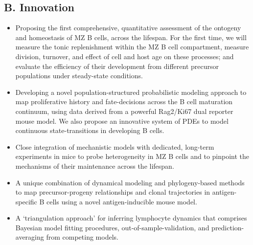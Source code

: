\documentclass[11pt]{article}
\begin{document}
\vspace{-2mm}
\subsection*{B. Innovation}
\vspace{-2mm}
\begin{itemize}
    \item Proposing the first comprehensive, quantitative assessment of the ontogeny and homeostasis of MZ B cells, across the lifespan.
    For the first time, we will measure the tonic replenishment within the MZ B cell compartment, measure division, turnover, and effect of cell and host age on these processes; and evaluate the efficiency of their development from different precursor populations under steady-state conditions.
    \item Developing a novel population-structured probabilistic modeling approach to map proliferative history and fate-decisions across the B cell maturation continuum, using data derived from a powerful Rag2/Ki67 dual reporter mouse model. %
   We also propose an innovative system of PDEs to model continuous state-transitions in developing B cells. %
   \item Close integration of  mechanistic models with dedicated, long-term experiments in mice to probe heterogeneity in MZ B cells and to pinpoint the mechanisms of their maintenance across the lifespan.   
    \item A unique combination of dynamical modeling and phylogeny-based methods to map precursor-progeny relationships and clonal trajectories in {antigen-specific B cells} using a novel antigen-inducible mouse model. %
    \item A `triangulation approach' for inferring lymphocyte dynamics that comprises Bayesian model fitting procedures, out-of-sample-validation, and  prediction-averaging from competing models. %

    \end{itemize}
    
\end{document}
